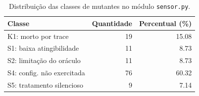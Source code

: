 \begin{table}[htbp]
\centering
\caption{Distribuição das classes de mutantes no módulo \texttt{sensor.py}.}
\label{tab:classes_mutantes_sensor}
\begin{tabular}{lrr}
\hline
\textbf{Classe} & \textbf{Quantidade} & \textbf{Percentual (\%)} \\
\hline
K1: morto por trace & 19 & 15.08 \\
S1: baixa atingibilidade & 11 & 8.73 \\
S2: limitação do oráculo & 11 & 8.73 \\
S4: config. não exercitada & 76 & 60.32 \\
S5: tratamento silencioso & 9 & 7.14 \\
\hline
\end{tabular}
\end{table}
